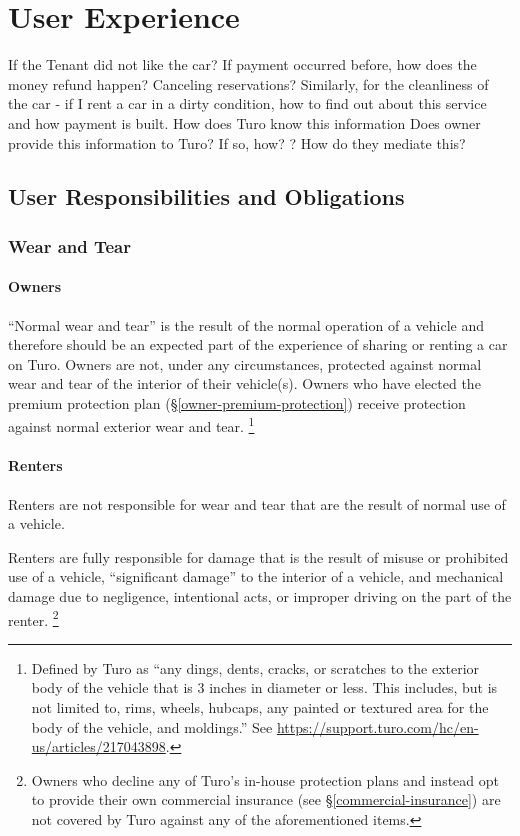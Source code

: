 \documentclass[review,12pt]{elsarticle}
\begin{document}
\section{User Experience}

If the Tenant did not like the car? If payment occurred before, how does the money refund happen? Canceling reservations?
Similarly, for the cleanliness of the car - if I rent a car in a dirty condition, how to find out about this service and how payment is built. How does Turo know this information Does owner provide this information to Turo? If so, how? ? How do they mediate this?

\subsection{User Responsibilities and Obligations}
  \subsubsection{Wear and Tear}
    \paragraph{Owners}
    ``Normal wear and tear'' is the result of the normal operation of a vehicle and therefore should be an expected part of the experience of sharing or renting a car on Turo. Owners are not, under any circumstances, protected against normal wear and tear of the interior of their vehicle(s). Owners who have elected the premium protection plan (\S\ref{owner-premium-protection}) receive protection against normal exterior wear and tear.
      \footnote{Defined by Turo as ``any dings, dents, cracks, or scratches to the exterior body of the vehicle that is 3 inches in diameter or less. This includes, but is not limited to, rims, wheels, hubcaps, any painted or textured area for the body of the vehicle, and moldings.'' See \url{https://support.turo.com/hc/en-us/articles/217043898}.
      }
    \paragraph{Renters}
    Renters are not responsible for wear and tear that are the result of normal use of a vehicle.

    Renters are fully responsible for damage that is the result of misuse or prohibited use of a vehicle, ``significant damage'' to the interior of a vehicle, and mechanical damage due to negligence, intentional acts, or improper driving on the part of the renter.
      \footnote{Owners who decline any of Turo's in-house protection plans and instead opt to provide their own commercial insurance (see \S\ref{commercial-insurance}) are not covered by Turo against any of the aforementioned items.
      }
\end{document}

